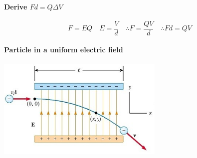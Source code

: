 \documentclass[12pt]{article}
\begin{document}
\paragraph{Derive $Fd=Q\Delta V$}
$$F=EQ \quad E=\frac{V}{d} \quad\therefore F=\frac{QV}{d} \quad\therefore Fd=QV$$
\paragraph{Particle in a uniform electric field}
\begin{center}
\includegraphics[width=8cm]{particle.jpg}
\end{center}
\end{document}
